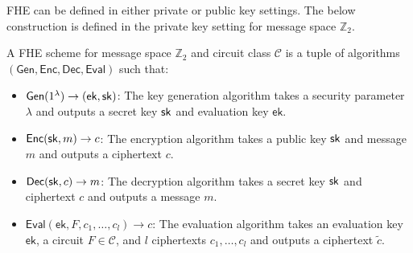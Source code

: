 \documentclass[12pt]{tufte-book}
\newcommand{\ek}{\mathsf{ek}}
\begin{document}
FHE can be defined in either private or public key settings. The below construction is defined in the private key setting for message space $\mathbb{Z}_2$.

\begin{definition}
    A FHE scheme for message space $\mathbb{Z}_2$ and circuit class $\mathcal{C}$ is a tuple of algorithms $(\mathsf{Gen}, \mathsf{Enc}, \mathsf{Dec}, \mathsf{Eval})$ such that:
    \begin{itemize}
        \item $\mathsf{Gen}(1^\lambda) \rightarrow (\ek, \sk)$: The key generation algorithm takes a security parameter $\lambda$ and outputs a secret key $\mathsf{sk}$ and evaluation key $\ek$.
        \item $\mathsf{Enc}(\mathsf{sk}, m) \rightarrow c$: The encryption algorithm takes a public key $\mathsf{sk}$ and message $m$ and outputs a ciphertext $c$.
        \item $\mathsf{Dec}(\mathsf{sk}, c) \rightarrow m$: The decryption algorithm takes a secret key $\mathsf{sk}$ and ciphertext $c$ and outputs a message $m$.
        \item $\mathsf{Eval}(\ek, F, c_1, \ldots, c_l) \rightarrow c$: The evaluation algorithm takes an evaluation key $\ek$, a circuit $F \in \mathcal{C}$, and $l$ ciphertexts $c_1, \ldots, c_l$ and outputs a ciphertext $\tilde{c}$.
    \end{itemize}
\end{definition}
\end{document}
